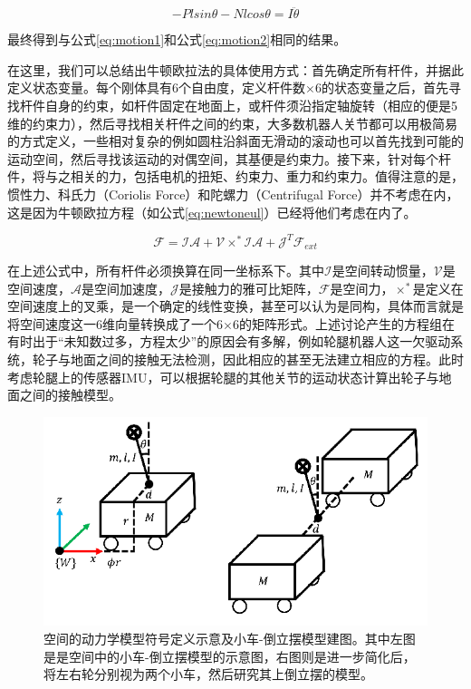 \begin{equation}
    -Plsin\theta - Nlcos\theta = I\ddot{\theta}
    \label{eq:pnrel}
\end{equation}

最终得到与公式\ref{eq:motion1}和公式\ref{eq:motion2}相同的结果。

在这里，我们可以总结出牛顿欧拉法的具体使用方式：首先确定所有杆件，并据此定义状态变量。每个刚体具有6个自由度，定义杆件数$\times$6的状态变量之后，首先寻找杆件自身的约束，如杆件固定在地面上，或杆件须沿指定轴旋转（相应的便是5维的约束力），然后寻找相关杆件之间的约束，大多数机器人关节都可以用极简易的方式定义，一些相对复杂的例如圆柱沿斜面无滑动的滚动也可以首先找到可能的运动空间，然后寻找该运动的对偶空间，其基便是约束力。接下来，针对每个杆件，将与之相关的力，包括电机的扭矩、约束力、重力和约束力。值得注意的是，惯性力、科氏力（Coriolis Force）和陀螺力（Centrifugal Force）并不考虑在内，这是因为牛顿欧拉方程\cite{featherstone2014rigid}（如公式\ref{eq:newtoneul}）已经将他们考虑在内了。

\begin{equation}
    \mathcal{F} = \mathcal{I}\mathcal{A} + \mathcal{V}\times^* \mathcal{I} \mathcal{A} + \mathcal{J}^T\mathcal{F}_{ext}
    \label{eq:newtoneul}
\end{equation}

在上述公式中，所有杆件必须换算在同一坐标系下。其中$\mathcal{I}$是空间转动惯量，$\mathcal{V}$是空间速度，$\mathcal{A}$是空间加速度，$\mathcal{J}$是接触力的雅可比矩阵，$\mathcal{F}$是空间力，$\times^*$是定义在空间速度上的叉乘，是一个确定的线性变换，甚至可以认为是同构，具体而言就是将空间速度这一6维向量转换成了一个6$\times$6的矩阵形式。上述讨论产生的方程组在有时出于“未知数过多，方程太少”的原因会有多解，例如轮腿机器人这一欠驱动系统，轮子与地面之间的接触无法检测，因此相应的甚至无法建立相应的方程。此时考虑轮腿上的传感器IMU，可以根据轮腿的其他关节的运动状态计算出轮子与地面之间的接触模型。

\begin{figure}
  \centering
  \includegraphics[width=0.45\linewidth]{figures/Sec4/3dsimple.png}
  \caption{
  空间的动力学模型符号定义示意及小车-倒立摆模型建图。其中左图是是空间中的小车-倒立摆模型的示意图，右图则是进一步简化后，将左右轮分别视为两个小车，然后研究其上倒立摆的模型。
  }
  \label{fig:sec4-3dsimple}
   \vspace{6pt}
\end{figure}

